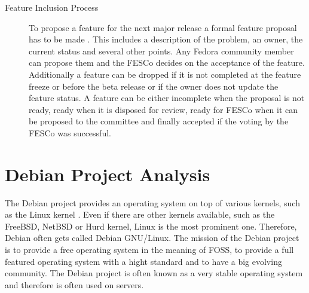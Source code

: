 \begin{description}
\begin{description}
    \item[Feature Inclusion Process] To propose a feature for the next major
      release a formal feature proposal has to be made
      \cite{FedoraFeatures,FedoraFESCo}. This includes a description of the
      problem, an owner, the current status and several other points. Any
      Fedora community member can propose them and the \ac{FESCo} decides on
      the acceptance of the feature. Additionally a feature can be dropped if
      it is not completed at the feature freeze or before the beta release or
      if the owner does not update the feature status. A feature can be either
      incomplete when the proposal is not ready, ready when it is disposed for
      review, ready for \ac{FESCo} when it can be proposed to the committee and
      finally accepted if the voting by the \ac{FESCo} was successful.

  \end{description}

\end{description}


\section{Debian Project Analysis} %


The Debian project provides an operating system on top of various kernels, such
as the Linux kernel \cite{DebianAbout,DebianPorts}. Even if there are other
kernels available, such as the FreeBSD, NetBSD or Hurd kernel, Linux is the
most prominent one. Therefore, Debian often gets called Debian \ac{GNU}/Linux.
The mission of the Debian project is to provide a free operating system in the
meaning of \ac{FOSS}, to provide a full featured operating system with a hight
standard and to have a big evolving community. The Debian project is often
known as a very stable operating system and therefore is often used on servers.

